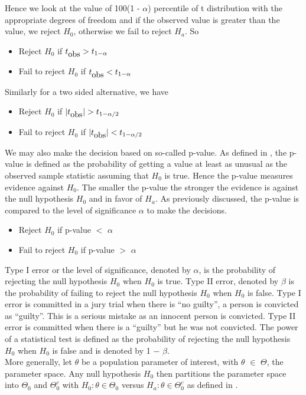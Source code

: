 \documentclass[12]{report}
\begin{document}
 Hence we look at the value of 100(1 - $\alpha$) percentile of t distribution with the appropriate degrees of freedom and if the observed value is greater than the value, we reject $H_0$, otherwise we fail to reject $H_a$. So
 \begin{itemize}
 \item Reject $H_0$ if $t_{\hbox{obs}} > t_{1 - \alpha}$
 \item Fail to reject $H_0$ if $t_{\hbox{obs}} < t_{1 - \alpha}$
 \end{itemize}
Similarly for a two sided alternative, we have 
  \begin{itemize}
 \item Reject $H_0$ if $|t_{\hbox{obs}}| > t_{1 - \alpha/2}$
 \item Fail to reject $H_0$ if $|t_{\hbox{obs}}| < t_{1 - \alpha/2}$
 \end{itemize}
 We may also make the decision based on so-called p-value. As defined in \cite{moore:2009}, the p-value is defined as the probability of getting a value at least as unusual as the observed sample statistic assuming that $H_0$ is true. Hence the p-value measures evidence against $H_0$. The smaller the p-value the stronger the evidence is against the null hypothesis $H_0$ and in favor of $H_a$. As previously discussed, the p-value is compared to the level of significance $\alpha$ to make the decisions.
  \begin{itemize}
 \item Reject $H_0$ if p-value $<$ $\alpha$
 \item Fail to reject $H_0$ if p-value $>$ $\alpha$
 \end{itemize}
 Type I error or the level of significance, denoted by $\alpha$, is the probability of rejecting the null hypothesis $H_0$ when $H_0$ is true. Type II error, denoted by $\beta$ is the probability of failing to reject the null hypothesis $H_0$ when $H_0$ is false. Type I error is committed in a jury trial when there is ``no guilty'', a person is convicted as ``guilty''. This is a serious mistake as an innocent person is convicted. Type II error is committed when there is a ``guilty'' but he was not convicted. The power of a statistical test is defined as the probability of rejecting the null hypothesis $H_0$ when $H_0$ is false and is denoted by 1 $-$ $\beta$. \\
 
More generally, let $\theta$ be a population parameter of interest, with $\theta$ $\in$ $\Theta$, the parameter space. Any null hypothesis $H_0$ then partitions the parameter space into $\Theta_0$ and $\Theta_0^c$ with $H_0: \theta \in \Theta_0$ versus $H_a: \theta  \in \Theta_0^c$ as defined in \cite{casella:2002}. \\
\end{document}
